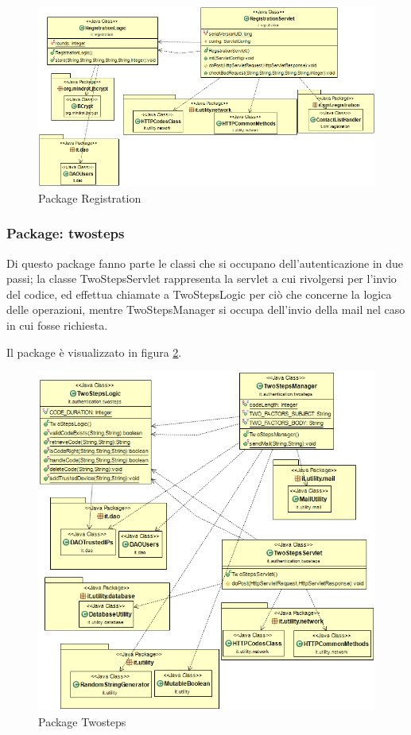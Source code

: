 \begin{figure}[!htbp]
	\centering
	\includegraphics[scale = .5]{img/dependencies_registration.png}
	\caption{Package Registration}
	\label{gfx:registration}
\end{figure}


\subsubsection{Package: \textbf{twosteps}}

Di questo package fanno parte le classi che si occupano dell’autenticazione in due passi; la classe TwoStepsServlet rappresenta la servlet a cui rivolgersi per l’invio del codice, ed effettua chiamate a TwoStepsLogic per ciò che concerne la logica delle operazioni, mentre TwoStepsManager si occupa dell’invio della mail nel caso in cui fosse richiesta.

Il package è visualizzato in figura \ref{gfx:dependencies_twosteps}.

\begin{figure}[!htbp]
	\centering
	\includegraphics[scale = .5]{img/dependencies_twosteps.png}
	\caption{Package Twosteps}
	\label{gfx:dependencies_twosteps}
\end{figure}

